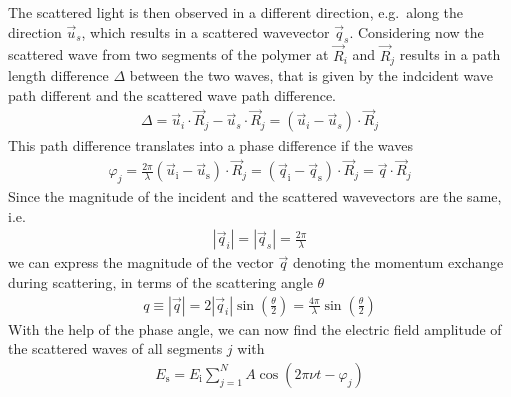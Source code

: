 \documentclass[letterpaper,10pt,english]{sphinxmanual}
\let\sphinxpxdimen\pdfpxdimen\else\newdimen\sphinxpxdimen
\begin{document}
\noindent\sphinxincludegraphics[width=672\sphinxpxdimen,height=424\sphinxpxdimen]{{scattering}.png}

\sphinxAtStartPar
The scattered light is then observed in a different direction, e.g. along the direction \(\vec{u}_s\), which results in a scattered wavevector \(\vec{q}_s\). Considering now the scattered wave from two segments of the polymer at \(\vec{R}_i\) and \(\vec{R}_j\) results in a path length difference \(\Delta\) between the two waves, that is given by the indcident wave path different and the scattered wave path difference.
\begin{equation*}
\begin{split}\Delta = \vec{u}_i\cdot \vec{R}_j - \vec{u}_s\cdot \vec{R}_j=(\vec{u}_i-\vec{u}_s)\cdot \vec{R}_j\end{split}
\end{equation*}
\sphinxAtStartPar
This path difference translates into a phase difference if the waves
\begin{equation*}
\begin{split}\varphi_{j}=\frac{2 \pi}{\lambda}\left(\vec{u}_{\mathrm{i}}-\vec{u}_{\mathrm{s}}\right) \cdot \vec{R}_{j}=\left(\vec{q}_{\mathrm{i}}-\vec{q}_{\mathrm{s}}\right) \cdot \vec{R}_{j}=\vec{q} \cdot \vec{R}_{j}\end{split}
\end{equation*}
\sphinxAtStartPar
Since the magnitude of the incident and the scattered wavevectors are the same, i.e.
\begin{equation*}
\begin{split}\left|\vec{q}_{i}\right|=\left|\vec{q}_{s}\right|=\frac{2 \pi}{\lambda}\end{split}
\end{equation*}
\sphinxAtStartPar
we can express the magnitude of the vector \(\vec{q}\) denoting the momentum exchange during scattering, in terms of the scattering angle \(\theta\)
\begin{equation*}
\begin{split}q \equiv|\vec{q}|=2\left|\vec{q}_{i}\right| \sin \left(\frac{\theta}{2}\right)=\frac{4 \pi}{\lambda} \sin \left(\frac{\theta}{2}\right)\end{split}
\end{equation*}
\sphinxAtStartPar
With the help of the phase angle, we can now find the electric field amplitude of the scattered waves of all segments \(j\) with
\begin{equation*}
\begin{split}E_{\mathrm{s}}=E_{\mathrm{i}} \sum_{j=1}^{N} A \cos \left(2 \pi \nu t-\varphi_{j}\right)\end{split}
\end{equation*}
\end{document}
